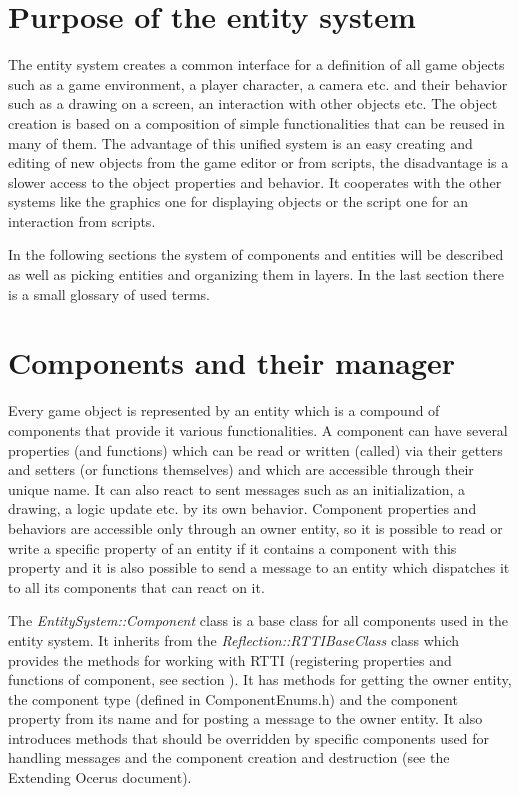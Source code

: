 \documentclass[a4paper, 12pt]{report}
\begin{document}
\section{Purpose of the entity system}

The entity system creates a common interface for a definition of all game objects such as a game environment, a player character, a camera etc. and their behavior such as a drawing on a screen, an interaction with other objects etc. The object creation is based on a composition of simple functionalities that can be reused in many of them. The advantage of this unified system is an easy creating and editing of new objects from the game editor or from scripts, the disadvantage is a slower access to the object properties and behavior. It cooperates with the other systems like the graphics one for displaying objects or the script one for an interaction from scripts.

In the following sections the system of components and entities will be described as well as picking entities and organizing them in layers. In the last section there is a small glossary of used terms.

\section{Components and their manager}

Every game object is represented by an entity which is a compound of components that provide it various functionalities. A component can have several properties (and functions) which can be read or written (called) via their getters and setters (or functions themselves) and which are accessible through their unique name. It can also react to sent messages such as an initialization, a drawing, a logic update etc. by its own behavior. Component properties and behaviors are accessible only through an owner entity, so it is possible to read or write a specific property of an entity if it contains a component with this property and it is also possible to send a message to an entity which dispatches it to all its components that can react on it.

The \emph{EntitySystem::Component} class is a base class for all components used in the entity system. It inherits from the \emph{Reflection::RTTIBaseClass} class which provides the methods for working with RTTI (registering properties and functions of component, see section 
).
It has methods for getting the owner entity, the component type (defined in ComponentEnums.h) and the component property from its name and for posting a message to the owner entity. It also introduces methods that should be overridden by specific components used for handling messages and the component creation and destruction (see the Extending Ocerus document).
\end{document}
